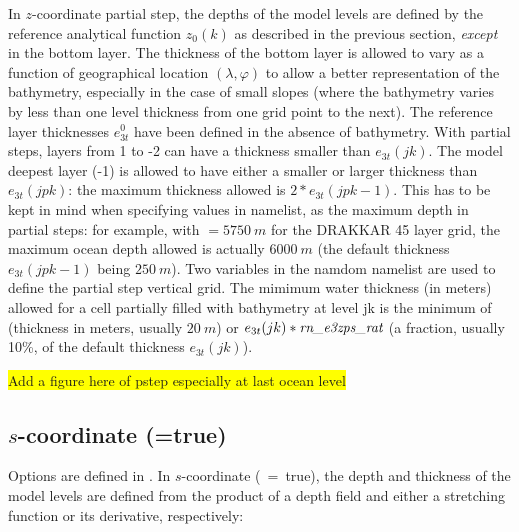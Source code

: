 {In $z$-coordinate partial step, the depths of the model levels are defined by the 
reference analytical function $z_0 (k)$ as described in the previous 
section, \emph{except} in the bottom layer. The thickness of the bottom layer is 
allowed to vary as a function of geographical location $(\lambda,\varphi)$ to allow a 
better representation of the bathymetry, especially in the case of small 
slopes (where the bathymetry varies by less than one level thickness from 
one grid point to the next). The reference layer thicknesses $e_{3t}^0$ have been 
defined in the absence of bathymetry. With partial steps, layers from 1 to 
-2 can have a thickness smaller than $e_{3t}(jk)$. The model deepest layer (-1) 
is allowed to have either a smaller or larger thickness than $e_{3t}(jpk)$: the 
maximum thickness allowed is $2*e_{3t}(jpk-1)$. This has to be kept in mind when 
specifying values in  namelist, as the maximum depth  
in partial steps: for example, with 
$=5750~m$ for the DRAKKAR 45 layer grid, the maximum ocean depth 
allowed is actually $6000~m$ (the default thickness $e_{3t}(jpk-1)$ being $250~m$). 
Two variables in the namdom namelist are used to define the partial step 
vertical grid. The mimimum water thickness (in meters) allowed for a cell 
partially filled with bathymetry at level jk is the minimum of  
(thickness in meters, usually $20~m$) or $e_{3t}(jk)*\np{rn\_e3zps\_rat}$ (a fraction, 
usually 10\%, of the default thickness $e_{3t}(jk)$).

 \colorbox{yellow}{Add a figure here of pstep especially at last ocean level }

\subsection   [$s$-coordinate (\np{ln\_sco})]
		     {$s$-coordinate (=true)}
\label{DOM_sco}
Options are defined in .
In $s$-coordinate (~=~true), the depth and thickness of the model 
levels are defined from the product of a depth field and either a stretching 
function or its derivative, respectively:

}
